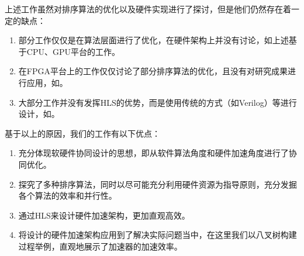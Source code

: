 上述工作虽然对排序算法的优化以及硬件实现进行了探讨，但是他们仍然存在着一定的缺点：
\begin{enumerate}
    \item 部分工作仅仅是在算法层面进行了优化，在硬件架构上并没有讨论，如上述基于CPU、GPU平台的工作\cite{zurek2013comparison, jan2012fast}。
    \item 在FPGA平台上的工作仅仅讨论了部分排序算法的优化，且没有对研究成果进行应用，如\cite{georgopoulos2016evaluation,chen2015energy, matai2016resolve, purnomo2016implementation}。
    \item 大部分工作并没有发挥HLS的优势，而是使用传统的方式（如Verilog）等进行设计，如\cite{chen2015energy, purnomo2016implementation}。
\end{enumerate}

基于以上的原因，我们的工作有以下优点：
\begin{enumerate}
    \item 充分体现软硬件协同设计的思想，即从软件算法角度和硬件加速角度进行了协同优化。
    \item 探究了多种排序算法，同时以尽可能充分利用硬件资源为指导原则，充分发掘各个算法的效率和并行性。
    \item 通过HLS来设计硬件加速架构，更加直观高效。
    \item 将设计的硬件加速架构应用到了解决实际问题当中，在这里我们以八叉树构建过程举例，直观地展示了加速器的加速效率。
\end{enumerate}


